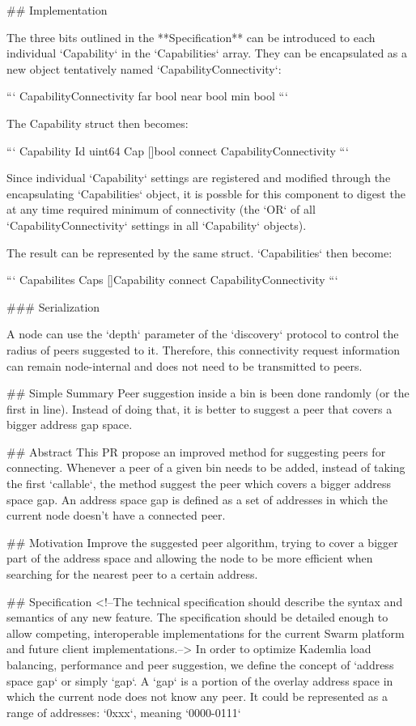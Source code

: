 ## Implementation

The three bits outlined in the **Specification** can be introduced to each individual `Capability` in the `Capabilities` array. They can be encapsulated as a new object tentatively named `CapabilityConnectivity`:

```
CapabilityConnectivity {
	far	bool
	near	bool
	min	bool
}
```

The Capability struct then becomes:

```
Capability {
	Id	uint64
	Cap	[]bool
	connect CapabilityConnectivity
}
```

Since individual `Capability` settings are registered and modified through the encapsulating `Capabilities` object, it is possble for this component to digest the at any time required minimum of connectivity (the `OR` of all `CapabilityConnectivity` settings in all `Capability` objects). 

The result can be represented by the same struct. `Capabilities` then become:

```
Capabilites {
	Caps	[]Capability
	connect CapabilityConnectivity
}
```

### Serialization

A node can use the `depth` parameter of the `discovery` protocol to control the radius of peers suggested to it. Therefore, this connectivity request information can remain node-internal and does not need to be transmitted to peers.

## Simple Summary
Peer suggestion inside a bin is been done randomly (or the first in line). Instead of doing that, it is better to suggest
a peer that covers a bigger address gap space.

## Abstract
This PR propose an improved method for suggesting peers for connecting. Whenever a peer of a given bin needs to be added,
instead of taking the first `callable`, the method suggest the peer which covers a bigger address space gap. 
An address space gap is defined as a set of addresses in which the current node doesn't have a connected peer.

## Motivation
Improve the suggested peer algorithm, trying to cover a bigger part of the address space and allowing the node to be 
more efficient when searching for the nearest peer to a certain address.

## Specification
<!--The technical specification should describe the syntax and semantics of any new feature. The specification should be detailed enough to allow competing, interoperable implementations for the current Swarm platform and future client implementations.-->
In order to optimize Kademlia load balancing, performance and peer suggestion, we define the concept of `address space gap`
or simply `gap`. 
A `gap` is a portion of the overlay address space in which the current node does not know any peer. It could be represented
as a range of addresses: `0xxx`, meaning `0000-0111`

